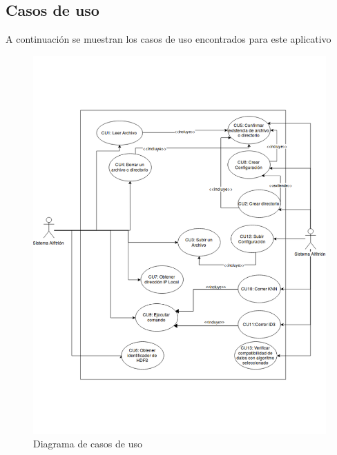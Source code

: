 \subsection{Casos de uso}
A continuación se muestran los casos de uso encontrados para este aplicativo 
\begin{figure}[H]
	\hypertarget{fig:confi}{\hspace{1pt}}
	\begin{center}	
		\includegraphics[width=1\textwidth]{capitulo4b/images/cu1.png}
		\caption{Diagrama de casos de uso}
		\label{fig:confi}
	\end{center}
\end{figure}

